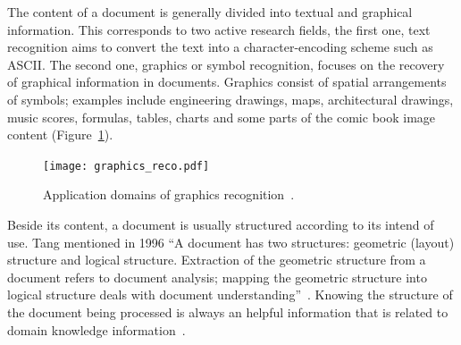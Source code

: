 


The content of a document is generally divided into textual and graphical information.
This corresponds to two active research fields, the first one, text recognition aims to convert the text into a character-encoding scheme such as ASCII.
The second one, graphics or symbol recognition, focuses on the recovery of graphical information in documents.
Graphics consist of spatial arrangements of symbols; examples include engineering drawings, maps, architectural drawings, music scores, formulas, tables, charts and some parts of the comic book image content (Figure~\ref{fig:sota:graphics_reco}).

    \begin{figure}[t]%
      \centering
      \texttt{[image: graphics\_reco.pdf]}
    \caption[Application domains of graphics recognition]{Application domains of graphics recognition~\cite{LladosIDIPSRecognition}.}
    \label{fig:sota:graphics_reco}
    \end{figure}

Beside its content, a document is usually structured according to its intend of use.
Tang mentioned in 1996 ``A document has two structures: geometric (layout) structure and logical structure.
Extraction of the geometric structure from a document refers to document analysis; mapping the geometric structure into logical structure deals with document understanding''~\cite{tang1996automatic}.
Knowing the structure of the document being processed is always an helpful information that is related to domain knowledge information~\cite{cooperman1998system,breuel2003high}.


